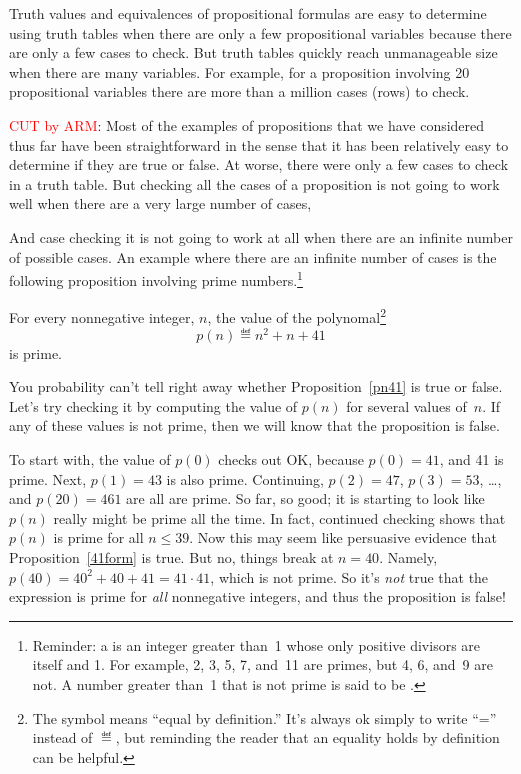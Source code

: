 Truth values and equivalences of propositional formulas are easy to
determine using truth tables when there are only a few propositional
variables because there are only a few cases to check.  But truth tables
quickly reach unmanageable size when there are many variables.  For
example, for a proposition involving 20 propositional
variables there are more than a million cases (rows) to check.  
\begin{editingnotes}
 \textcolor{red}{CUT by ARM}:
  Most of the examples of propositions that we have considered thus far
  have been straightforward in the sense that it has been relatively easy
  to determine if they are true or false.  At worse, there were only a few
  cases to check in a truth table.  But checking all the cases of a
  proposition is not going to work well when there are a very large number
  of cases,
\end{editingnotes}
 And case checking it is not going to work at all when there
are an infinite number of possible cases.  An example where there are an
infinite number of cases is the following proposition involving prime
numbers.\footnote{Reminder: a  is an integer greater than~1
  whose only positive divisors are itself and 1.  For example, 2, 3, 5, 7,
  and~11 are primes, but 4, 6, and~9 are not.  A number greater than~1
  that is not prime is said to be .}
\begin{proposition}\label{41form}
For every nonnegative integer, $n$, the value of the
polynomal\footnote{The symbol \term{$\eqdef$} means ``equal by
  definition.''  It's always ok simply to write ``='' instead of
  $\eqdef$, but reminding the reader that an equality holds by
  definition can be helpful.}
\begin{equation}\label{pn41}
p(n) \eqdef  n^2 + n + 41
\end{equation}
is prime.
\end{proposition}
You probability can't tell right away whether Proposition~\ref{pn41}
is true or false.  Let's try checking it by computing the value of
$p(n)$ for several values of~$n$.  If any of these values is not
prime, then we will know that the proposition is false.

To start with, the value of $p(0)$ checks out OK, because $p(0) = 41$,
and 41 is prime.  Next, $p(1) = 43$ is also prime.  Continuing, $p(2)
= 47$, $p(3)=53$, \dots, and $p(20) = 461$ are all are prime.  So far,
so good; it is starting to look like $p(n)$ really might be prime all
the time.  In fact, continued checking shows that $p(n)$ is prime for
all $n \le 39$.  Now this may seem like persuasive evidence that
Proposition~\ref{41form} is true.  But no, things break at $n=40$.
Namely, $p(40) = 40^2 + 40 + 41 = 41 \cdot 41$, which is not prime.
So it's \emph{not} true that the expression is prime for \emph{all}
nonnegative integers, and thus the proposition is false!

